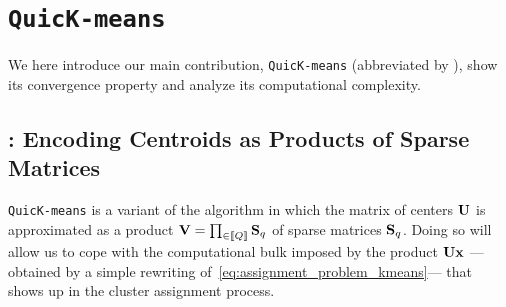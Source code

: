 
\section{\texttt{QuicK-means}}
\label{sec:contribution}

We here introduce our main contribution, \texttt{QuicK-means} (abbreviated by \qkmeans), 
show its convergence property and analyze its computational complexity.


\subsection{\qkmeans: Encoding Centroids as Products of Sparse Matrices}
\label{sec:qkmeans:algo}

\texttt{QuicK-means} is a variant of the \kmeans algorithm in which the matrix of centers ${\mathbf{U}}$
is approximated as a product ${\mathbf{V}}=\prod_{\in\left \llbracket Q\right \rrbracket}{\mathbf{S}}_q$ of sparse matrices ${\mathbf{S}}_q$.
Doing so will allow us to cope with the computational bulk imposed by the product ${\mathbf{U}}{\mathbf{x}}$
---obtained by a simple rewriting of~\eqref{eq:assignment_problem_kmeans}--- that shows up in the cluster assignment 
process.

